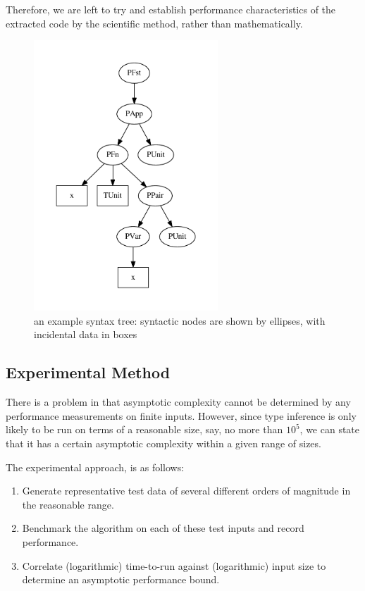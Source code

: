 Therefore, we are left to try and establish performance characteristics of the extracted code by the scientific method, rather than mathematically.

\begin{figure}
\centering
\includegraphics[height=4in]{chapters/evaluation/figures/example-tree.pdf}
\caption{an example syntax tree: syntactic nodes are shown by ellipses, with incidental data in boxes}
\label{fig:example-tree}
\end{figure}

\subsection{Experimental Method}
There is a problem in that asymptotic complexity cannot be determined by any performance measurements on finite inputs.
However, since type inference is only likely to be run on terms of a reasonable size, say, no more than \(10^5\), we can state that it has a certain asymptotic complexity within a given range of sizes.

The experimental approach, is as follows:
\begin{enumerate}
\item
Generate representative test data of several different orders of magnitude in the reasonable range.
\item
Benchmark the algorithm on each of these test inputs and record performance.
\item
Correlate (logarithmic) time-to-run against (logarithmic) input size to determine an asymptotic performance bound.
\end{enumerate}

